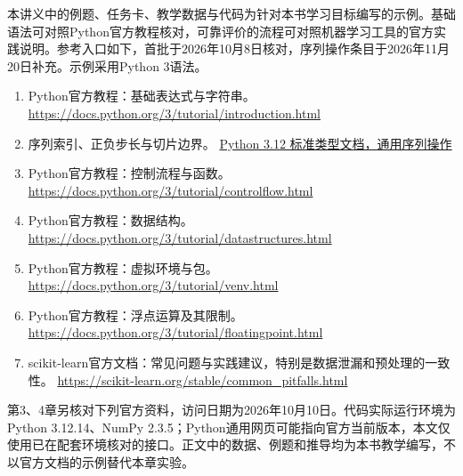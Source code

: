 \documentclass[UTF8,fontset=none,zihao=-4,a4paper]{ctexart}
\numberwithin{equation}{section}
\numberwithin{figure}{section}
\begin{document}
本讲义中的例题、任务卡、教学数据与代码为针对本书学习目标编写的示例。基础语法可对照Python官方教程核对，可靠评价的流程可对照机器学习工具的官方实践说明。参考入口如下，首批于2026年10月8日核对，序列操作条目于2026年11月20日补充。示例采用Python 3语法。
\begin{enumerate}
\item Python官方教程：基础表达式与字符串。\newline
\url{https://docs.python.org/3/tutorial/introduction.html}
\item 序列索引、正负步长与切片边界。\newline
\href{https://docs.python.org/3.12/library/stdtypes.html#common-sequence-operations}{Python 3.12 标准类型文档，通用序列操作}
\item Python官方教程：控制流程与函数。\newline
\url{https://docs.python.org/3/tutorial/controlflow.html}
\item Python官方教程：数据结构。\newline
\url{https://docs.python.org/3/tutorial/datastructures.html}
\item Python官方教程：虚拟环境与包。\newline
\url{https://docs.python.org/3/tutorial/venv.html}
\item Python官方教程：浮点运算及其限制。\newline
\url{https://docs.python.org/3/tutorial/floatingpoint.html}
\item scikit-learn官方文档：常见问题与实践建议，特别是数据泄漏和预处理的一致性。\newline
\url{https://scikit-learn.org/stable/common_pitfalls.html}
\end{enumerate}
第3、4章另核对下列官方资料，访问日期为2026年10月10日。代码实际运行环境为Python 3.12.14、NumPy 2.3.5；Python通用网页可能指向官方当前版本，本文仅使用已在配套环境核对的接口。正文中的数据、例题和推导均为本书教学编写，不以官方文档的示例替代本章实验。
\end{document}
